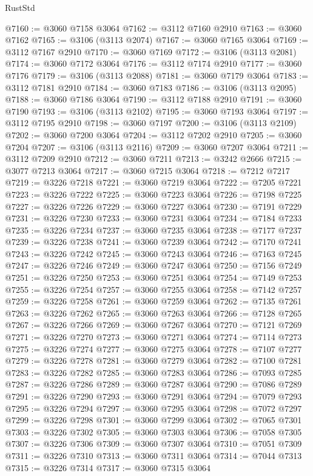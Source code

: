 \begin{lexlean}{RustStd}
\begin{coremodule}
@7160 := @3060 @7158 @3064
@7162 := @3112 @7160 @2910
@7163 := @3060 @7162
@7165 := @3106 (@3113 @2074)
@7167 := @3060 @7165 @3064
@7169 := @3112 @7167 @2910
@7170 := @3060 @7169
@7172 := @3106 (@3113 @2081)
@7174 := @3060 @7172 @3064
@7176 := @3112 @7174 @2910
@7177 := @3060 @7176
@7179 := @3106 (@3113 @2088)
@7181 := @3060 @7179 @3064
@7183 := @3112 @7181 @2910
@7184 := @3060 @7183
@7186 := @3106 (@3113 @2095)
@7188 := @3060 @7186 @3064
@7190 := @3112 @7188 @2910
@7191 := @3060 @7190
@7193 := @3106 (@3113 @2102)
@7195 := @3060 @7193 @3064
@7197 := @3112 @7195 @2910
@7198 := @3060 @7197
@7200 := @3106 (@3113 @2109)
@7202 := @3060 @7200 @3064
@7204 := @3112 @7202 @2910
@7205 := @3060 @7204
@7207 := @3106 (@3113 @2116)
@7209 := @3060 @7207 @3064
@7211 := @3112 @7209 @2910
@7212 := @3060 @7211
@7213 := @3242 @2666
@7215 := @3077 @7213 @3064
@7217 := @3060 @7215 @3064
@7218 := @7212 @7217
@7219 := @3226 @7218
@7221 := @3060 @7219 @3064
@7222 := @7205 @7221
@7223 := @3226 @7222
@7225 := @3060 @7223 @3064
@7226 := @7198 @7225
@7227 := @3226 @7226
@7229 := @3060 @7227 @3064
@7230 := @7191 @7229
@7231 := @3226 @7230
@7233 := @3060 @7231 @3064
@7234 := @7184 @7233
@7235 := @3226 @7234
@7237 := @3060 @7235 @3064
@7238 := @7177 @7237
@7239 := @3226 @7238
@7241 := @3060 @7239 @3064
@7242 := @7170 @7241
@7243 := @3226 @7242
@7245 := @3060 @7243 @3064
@7246 := @7163 @7245
@7247 := @3226 @7246
@7249 := @3060 @7247 @3064
@7250 := @7156 @7249
@7251 := @3226 @7250
@7253 := @3060 @7251 @3064
@7254 := @7149 @7253
@7255 := @3226 @7254
@7257 := @3060 @7255 @3064
@7258 := @7142 @7257
@7259 := @3226 @7258
@7261 := @3060 @7259 @3064
@7262 := @7135 @7261
@7263 := @3226 @7262
@7265 := @3060 @7263 @3064
@7266 := @7128 @7265
@7267 := @3226 @7266
@7269 := @3060 @7267 @3064
@7270 := @7121 @7269
@7271 := @3226 @7270
@7273 := @3060 @7271 @3064
@7274 := @7114 @7273
@7275 := @3226 @7274
@7277 := @3060 @7275 @3064
@7278 := @7107 @7277
@7279 := @3226 @7278
@7281 := @3060 @7279 @3064
@7282 := @7100 @7281
@7283 := @3226 @7282
@7285 := @3060 @7283 @3064
@7286 := @7093 @7285
@7287 := @3226 @7286
@7289 := @3060 @7287 @3064
@7290 := @7086 @7289
@7291 := @3226 @7290
@7293 := @3060 @7291 @3064
@7294 := @7079 @7293
@7295 := @3226 @7294
@7297 := @3060 @7295 @3064
@7298 := @7072 @7297
@7299 := @3226 @7298
@7301 := @3060 @7299 @3064
@7302 := @7065 @7301
@7303 := @3226 @7302
@7305 := @3060 @7303 @3064
@7306 := @7058 @7305
@7307 := @3226 @7306
@7309 := @3060 @7307 @3064
@7310 := @7051 @7309
@7311 := @3226 @7310
@7313 := @3060 @7311 @3064
@7314 := @7044 @7313
@7315 := @3226 @7314
@7317 := @3060 @7315 @3064

\end{coremodule}
\end{lexlean}
